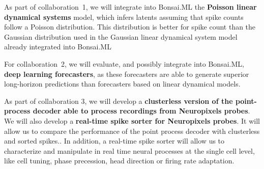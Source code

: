 As part of collaboration~1, we will integrate into Bonsai.ML the \textbf{Poisson
linear dynamical systems} model, which infers latents assuming that spike
counts follow a Poisson distribution. This distribution is better for spike
count than the Gaussian distribution used in the Gaussian linear dynamical
system model already integrated into Bonsai.ML

For collaboration~2, we will evaluate, and possibly integrate into Bonsai.ML,
\textbf{deep learning forecasters}, as these forecasters are able to generate
superior long-horizon predictions than forecasters based on linear dynamical
models.

As part of collaboration 3, we will develop a \textbf{clusterless version of
the point-process decoder able to process recordings from Neuropixels probes}.
%
We will also develop a \textbf{real-time spike sorter for Neuropixels probes}.
%
It will allow us to compare the performance of the point process decoder with
clusterless and sorted spikes..
%
In addition, a real-time spike sorter will allow us to characterize and
manipulate in real time neural processes at the single cell level, like cell
tuning, phase precession, head direction or firing rate adaptation.
